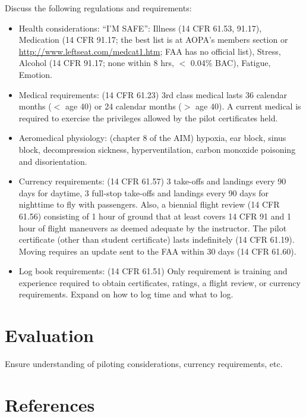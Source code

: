 \documentclass[twoside,openright]{report}
\begin{document}
Discuss the following regulations and requirements:

\begin{itemize}
  \item Health considerations: ``I'M SAFE'': Illness (14 CFR 61.53, 91.17),
    Medication (14 CFR 91.17; the best list is at AOPA's members section or
    \url{http://www.leftseat.com/medcat1.htm}; FAA has no official list),
    Stress, Alcohol (14 CFR 91.17; none within 8 hrs, $<$ 0.04\% BAC), Fatigue,
    Emotion.

  \item Medical requirements: (14 CFR 61.23) 3rd class medical lasts 36
    calendar months ($<$ age 40) or 24 calendar months ($>$ age 40). A current
    medical is required to exercise the privileges allowed by the pilot
    certificates held.

  \item Aeromedical physiology: (chapter 8 of the AIM) hypoxia, ear block,
    sinus block, decompression sickness, hyperventilation, carbon monoxide
    poisoning and disorientation.

  \item Currency requirements: (14 CFR 61.57) 3 take-offs and landings every 90
    days for daytime, 3 full-stop take-offs and landings every 90 days for
    nighttime to fly with passengers. Also, a biennial flight review (14 CFR
    61.56) consisting of 1 hour of ground that at least covers 14 CFR 91 and 1
    hour of flight maneuvers as deemed adequate by the instructor. The pilot
    certificate (other than student certificate) lasts indefinitely (14 CFR
    61.19). Moving requires an update sent to the FAA within 30 days (14 CFR
    61.60).

  \item Log book requirements: (14 CFR 61.51) Only requirement is training and
    experience required to obtain certificates, ratings, a flight review, or
    currency requirements. Expand on how to log time and what to log.

\end{itemize}

\section{Evaluation}

Ensure understanding of piloting considerations, currency requirements, etc.

\section{References}
\end{document}
